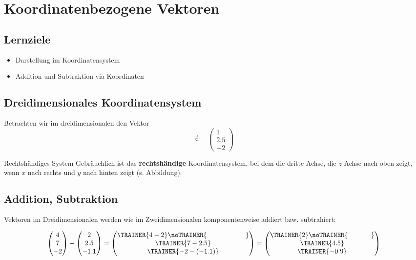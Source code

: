 \section{Koordinatenbezogene Vektoren}

\subsection*{Lernziele}
\begin{itemize}
\item Darstellung im Koordinatensystem
\item Addition und Subtraktion via Koordinaten
\end {itemize}

\subsection{Dreidimensionales Koordinatensystem}

Betrachten wir im dreidimensionalen den Vektor
$$\vec{a} = \begin{pmatrix}1 \\ 2.5 \\ -2\end{pmatrix}$$


  \begin{bemerkung}{Rechtshändiges System}{}
Gebräuchlich ist das \textbf{rechtshändige} Koordinatensystem, bei dem
die dritte Achse, die $z$-Achse nach oben zeigt, wenn $x$ nach rechts
und $y$ nach hinten zeigt (s. Abbildung).
  \end{bemerkung}
\newpage

\subsection{Addition, Subtraktion}
Vektoren im Dreidimensionalen werden wie im Zweidimensionalen
komponentenweise addiert bzw. subtrahiert:

$$\begin{pmatrix}4 \\ 7 \\ -2\end{pmatrix} - \begin{pmatrix}2 \\ 2.5  \\ -1.1\end{pmatrix} =
    \begin{pmatrix}\TRAINER{4-2}\noTRAINER{\hspace{20mm}} \\ \TRAINER{7-2.5} \\ \TRAINER{-2 - (-1.1)}\end{pmatrix}=
    \begin{pmatrix}\TRAINER{2}\noTRAINER{\hspace{12mm}}  \\ \TRAINER{4.5} \\ \TRAINER{-0.9}\end{pmatrix}$$
